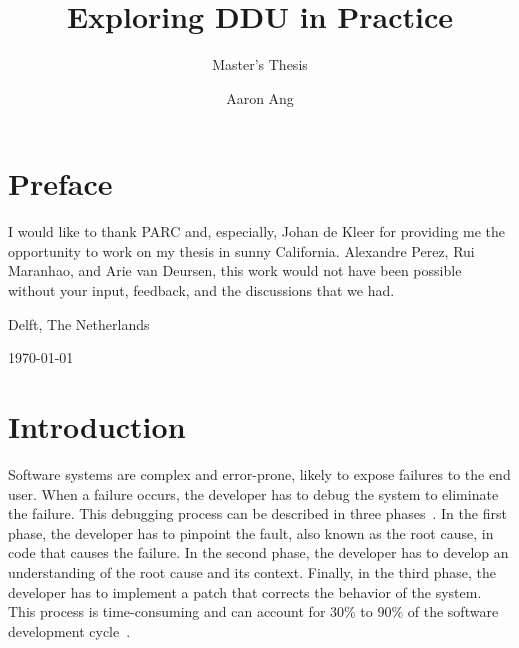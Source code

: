 \documentclass[twoside,a4paper,11pt]{memoir}
\title{Exploring DDU in Practice}
\subtitle{Master's Thesis}
\author{Aaron Ang}
\begin{document}
\frontmatter
\thispagestyle{empty}
\maketitle
{}

\chapter{Preface}%
\label{ch:preface}

I would like to thank PARC and, especially, Johan de Kleer for providing me the opportunity to work on my thesis in sunny California.
Alexandre Perez, Rui Maranhao, and Arie van Deursen, this work would not have been possible without your input, feedback, and the discussions that we had.

\vspace{1cm}
\begin{flushright}
\theauthor%

Delft, The Netherlands

\today%
\end{flushright}

\cleardoublepage\tableofcontents
\cleardoublepage\listoffigures
\cleardoublepage\mainmatter%

\chapter{Introduction}%
\label{ch:introduction}
Software systems are complex and error-prone, likely to expose failures to the end user.
When a failure occurs, the developer has to debug the system to eliminate the failure.
This debugging process can be described in three phases~\cite{Parnin:2011:ADT:2001420.2001445}.
In the first phase, the developer has to pinpoint the fault, also known as the root cause, in code that causes the failure.
In the second phase, the developer has to develop an understanding of the root cause and its context.
Finally, in the third phase, the developer has to implement a patch that corrects the behavior of the system.
This process is time-consuming and can account for 30\% to 90\% of the software development cycle~\cite{robbins2003debugging, beizer2003software, britton2013reversible}.
\end{document}
